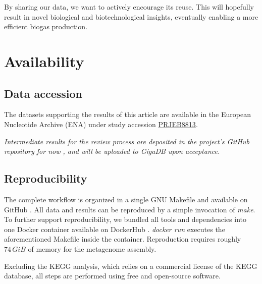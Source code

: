 \documentclass{bmcart}
\begin{document}
By sharing our data, we want to actively encourage its reuse. This will hopefully result in novel biological and biotechnological insights, eventually enabling a more efficient biogas production.

\section*{Availability}

\subsection*{Data accession}
The datasets supporting the results of this article are available in the European Nucleotide Archive (ENA) under study accession \href{http://www.ebi.ac.uk/ena/data/view/PRJEB8813}{PRJEB8813}.

\emph{Intermediate results for the review process are deposited in the project's GitHub repository for now \cite{GitHub}, and will be uploaded to GigaDB \cite{GigaDB} upon acceptance.}

\subsection*{Reproducibility}
The complete workflow is organized in a single GNU Makefile and available on GitHub \cite{GitHub}.
All data and results can be reproduced by a simple invocation of \emph{make}.
To further support reproducibility, we bundled all tools and dependencies into one Docker container available on DockerHub \cite{DockerHub}. \emph{docker run} executes the aforementioned Makefile inside the container. Reproduction requires roughly $74\,GiB$ of memory for the metagenome assembly.

Excluding the KEGG analysis, which relies on a commercial license of the KEGG database, all steps are performed using free and open-source software.

\end{document}

